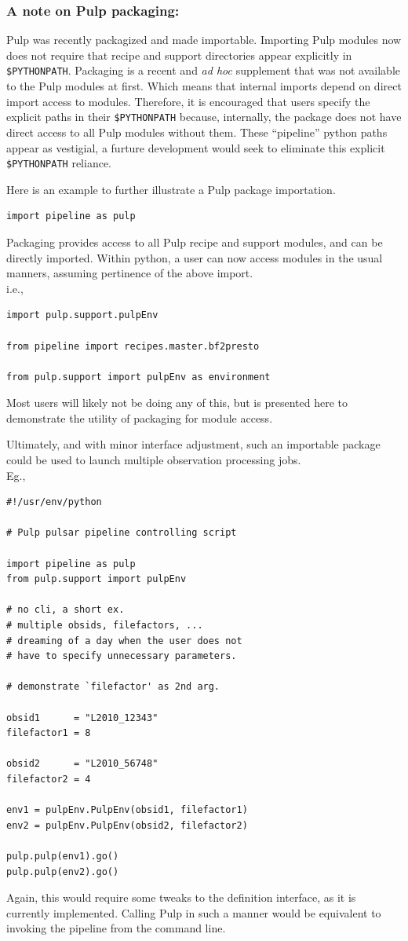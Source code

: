 \documentclass[a4paper,10pt,bibtotoc]{scrartcl}
\begin{document}
\subsubsection{A note on Pulp packaging:}
Pulp was recently packagized and made importable.  Importing Pulp
modules now does not require that recipe and support directories appear explicitly in \verb|$PYTHONPATH|.   Packaging is a recent and \emph{ad hoc} supplement  that was not available to the Pulp modules at first.  Which means that internal imports depend on direct import access to modules.  Therefore, it is encouraged that users specify the explicit paths in their  \verb|$PYTHONPATH| because, internally, the package does not have direct access to all Pulp modules without them.  These ``pipeline'' python paths appear as vestigial, a furture development would seek to eliminate this explicit \verb|$PYTHONPATH| reliance. 

Here is an example to further illustrate a Pulp package importation.

\begin{verbatim}
import pipeline as pulp
\end{verbatim}

Packaging provides access to all Pulp recipe and support modules, and can be directly imported.   Within python, a user can now access modules in the usual manners, assuming pertinence of the above import.\\
 i.e.,
\begin{verbatim}
import pulp.support.pulpEnv

from pipeline import recipes.master.bf2presto

from pulp.support import pulpEnv as environment
\end{verbatim}
Most users will likely not be doing any of this, but is presented here to demonstrate the utility of packaging for module access. 

Ultimately, and with minor interface adjustment, such an importable package could be used to launch multiple observation processing jobs. \\
 Eg.,
\begin{verbatim}
#!/usr/env/python

# Pulp pulsar pipeline controlling script

import pipeline as pulp
from pulp.support import pulpEnv

# no cli, a short ex. 
# multiple obsids, filefactors, ... 
# dreaming of a day when the user does not
# have to specify unnecessary parameters.

# demonstrate `filefactor' as 2nd arg.

obsid1      = "L2010_12343"
filefactor1 = 8

obsid2      = "L2010_56748"
filefactor2 = 4

env1 = pulpEnv.PulpEnv(obsid1, filefactor1)
env2 = pulpEnv.PulpEnv(obsid2, filefactor2)

pulp.pulp(env1).go()
pulp.pulp(env2).go()
\end{verbatim}
Again, this would require some tweaks to the definition interface, as
it is currently implemented. Calling Pulp in such a manner would be
equivalent to invoking the pipeline from the command line.
\end{document}
